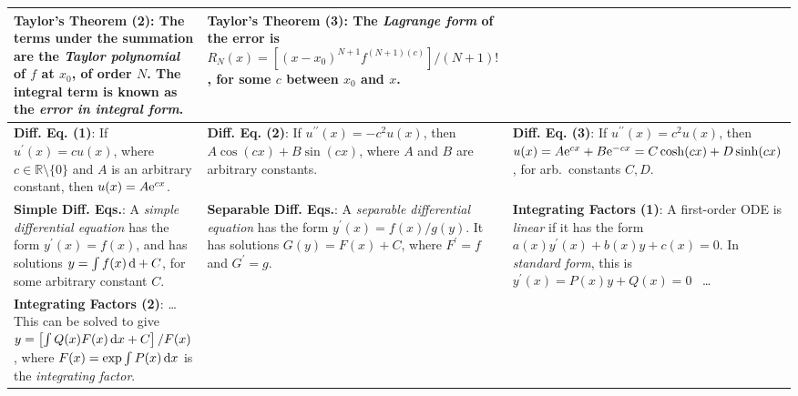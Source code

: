 \begin{tabular}{|m{.31\linewidth}|m{.31\linewidth}|m{.31\linewidth}|}
\textbf{Taylor's Theorem (2)}:
    The terms under the summation are the \emph{Taylor polynomial} of $ f $ at
    $ x_0 $, of order $ N $. The integral term is known as the \emph{error in
    integral form}. &

\textbf{Taylor's Theorem (3)}:
    The \emph{Lagrange form} of the error is
        $ R_N(x) = \left[
            (x - x_0)^{N + 1} f^{(N + 1)(c)}
        \right] / (N+1)!$,
    for some $ c $ between $ x_0 $ and $ x $. \\

\hline

\textbf{Diff. Eq. (1)}:
    If
        $ u^\prime(x) = cu(x)$, where
        $ c \in \mathbb{R} \setminus \{ 0 \} $ and
        $A$ is an arbitrary constant,
    then
            $ u(x) = A \mathrm{e}^{cx} $. &

\textbf{Diff. Eq. (2)}:
    If
        $ u^{\prime\prime}(x) = -c^2u(x)$,
    then
        $ A \cos(cx) + B \sin(cx) $, where
        $ A $ and $ B $ are arbitrary constants. &

\textbf{Diff. Eq. (3)}:
    If
        $ u^{\prime\prime}(x) = c^2 u(x) $,
    then
        $ u(x) =
            A \mathrm{e}^{cx} + B\mathrm{e}^{-cx} =
            C \cosh(cx) + D\sinh(cx)$,
        for arb.\ constants $ C, D $. \\

\hline

\textbf{Simple Diff. Eqs.}:
    A \emph{simple differential equation} has the form
        $ y^\prime(x) = f(x) $,
    and has solutions
        $ y = \int f(x)
            \, \mathrm{d}
        + C $,
    for some arbitrary constant $ C $. &

\textbf{Separable Diff. Eqs.}:
    A \emph{separable differential equation} has the form
        $ y^\prime(x) = f(x) / g(y) $.
    It has solutions $ G(y) = F(x) + C$, where
        $ F^\prime = f $ and
        $ G^\prime = g $. &

\textbf{Integrating Factors (1)}:
    A first-order ODE is \emph{linear} if it has the form
        $ a(x)y^\prime(x) + b(x)y + c(x) = 0$.
    In \emph{standard form}, this is
        $y^\prime(x) = P(x)y + Q(x) = 0$\ %
    \ldots \\

\hline

\textbf{Integrating Factors (2)}: \ldots\ %
    This can be solved to give
        $ y = \left[
            \int Q(x) F(x)
            \,\mathrm{d}x
        + C\right] / F(x)$,
    where
        $ F(x) = \exp
            \int P(x)
            \,\mathrm{d}x $
    is the \emph{integrating factor}. &


\end{tabular}
